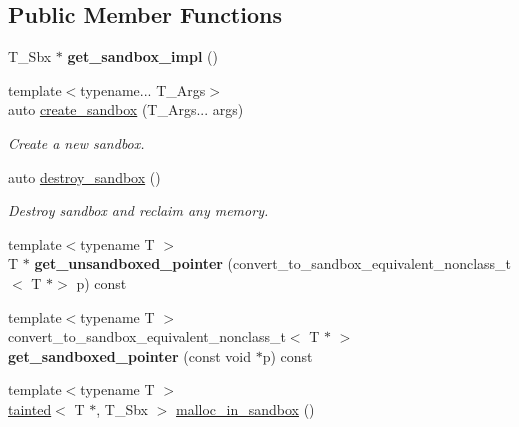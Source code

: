 \subsection*{Public Member Functions}
\begin{DoxyCompactItemize}
\item 
\mbox{\label{classrlbox_1_1rlbox__sandbox_a32de91755a582024dc43b879ef192b2c}} 
T\+\_\+\+Sbx $\ast$ {\bfseries get\+\_\+sandbox\+\_\+impl} ()
\item 
{\footnotesize template$<$typename... T\+\_\+\+Args$>$ }\\auto \hyperlink{classrlbox_1_1rlbox__sandbox_a7b938866462f607bcc069770c1bc1ba6}{create\+\_\+sandbox} (T\+\_\+\+Args... args)
\begin{DoxyCompactList}\small\item\em Create a new sandbox. \end{DoxyCompactList}\item 
\mbox{\label{classrlbox_1_1rlbox__sandbox_ac2be161ed2183fa8bc319232a8d74da6}} 
auto \hyperlink{classrlbox_1_1rlbox__sandbox_ac2be161ed2183fa8bc319232a8d74da6}{destroy\+\_\+sandbox} ()
\begin{DoxyCompactList}\small\item\em Destroy sandbox and reclaim any memory. \end{DoxyCompactList}\item 
\mbox{\label{classrlbox_1_1rlbox__sandbox_a76a853547e516435fe4536d6d5bd4c0d}} 
{\footnotesize template$<$typename T $>$ }\\T $\ast$ {\bfseries get\+\_\+unsandboxed\+\_\+pointer} (convert\+\_\+to\+\_\+sandbox\+\_\+equivalent\+\_\+nonclass\+\_\+t$<$ T $\ast$$>$ p) const
\item 
\mbox{\label{classrlbox_1_1rlbox__sandbox_a3069e9c6c67a12aff85af0e7b7068b98}} 
{\footnotesize template$<$typename T $>$ }\\convert\+\_\+to\+\_\+sandbox\+\_\+equivalent\+\_\+nonclass\+\_\+t$<$ T $\ast$ $>$ {\bfseries get\+\_\+sandboxed\+\_\+pointer} (const void $\ast$p) const
\item 
{\footnotesize template$<$typename T $>$ }\\\hyperlink{classrlbox_1_1tainted}{tainted}$<$ T $\ast$, T\+\_\+\+Sbx $>$ \hyperlink{classrlbox_1_1rlbox__sandbox_ab6ecbc8d0d69a3305912fe92882ef6b9}{malloc\+\_\+in\+\_\+sandbox} ()
$$
\end{DoxyCompactItemize}
